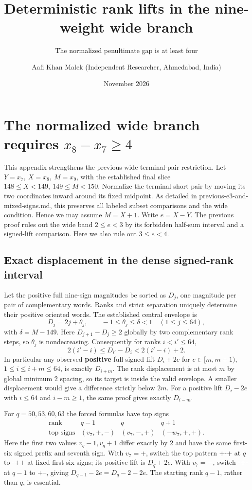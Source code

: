 \documentclass[
  11pt,
]{article}
\title{Deterministic rank lifts in the nine-weight wide branch}
\subtitle{The normalized penultimate gap is at least four}
\author{Aafi Khan Malek (Independent Researcher, Ahmedabad, India)}
\date{November 2026}
\begin{document}
\maketitle

\section{\texorpdfstring{The normalized wide branch requires
\(x_8-x_7\ge4\)}{The normalized wide branch requires x\_8-x\_7\textbackslash ge4}}\label{the-normalized-wide-branch-requires-x_8-x_7ge4}

This appendix strengthens the previous wide terminal-pair restriction.
Let \(Y=x_7,\ X=x_8,\ M=x_9\), with the established final slice
\(148\le X<149,\ 149\le M<150\). Normalize the terminal short pair by
moving its two coordinates inward around its fixed midpoint. As detailed
in previous-e3-and-mixed-signs.md, this preserves all labeled subset
comparisons and the wide condition. Hence we may assume \(M=X+1\). Write
\(e=X-Y\). The previous proof rules out the wide band \(2\le e<3\) by
its forbidden half-sum interval and a signed-lift comparison. Here we
also rule out \(3\le e<4\).

\subsection{Exact displacement in the dense signed-rank
interval}\label{exact-displacement-in-the-dense-signed-rank-interval}

Let the positive full nine-sign magnitudes be sorted as \(D_j\), one
magnitude per pair of complementary words. Ranks and strict separation
uniquely determine their positive oriented words. The established
central envelope is \[
  D_j=2j+\theta_j,\qquad -1\le\theta_j\le\delta<1
  \quad(1\le j\le64),
\] with \(\delta=M-149\). Here \(D_{j+1}-D_j\ge2\) globally by two
complementary rank steps, so \(\theta_j\) is nondecreasing. Consequently
for ranks \(i<i'\le64\), \[
 2(i'-i)\le D_{i'}-D_i<2(i'-i)+2 .
\] In particular any observed \textbf{positive} full signed lift
\(D_i+2e\) for \(e\in[m,m+1)\), \(1\le i\le i+m\le64\), is exactly
\(D_{i+m}\). The rank displacement is at most \(m\) by global minimum 2
spacing, so its target is inside the valid envelope. A smaller
displacement would give a difference strictly below \(2m\). For a
positive lift \(D_i-2e\) with \(i\le64\) and \(i-m\ge1\), the same proof
gives exactly \(D_{i-m}\).

For \(q=50,53,60,63\) the forced formulas have top signs \[
\begin{array}{c|ccc}
\text{rank}&q-1&q&q+1\\
\text{top signs}&(v_7,+,-)&(v_7,-,+)&(-w_7,+,+).
\end{array}
\] Here the first two values \(v_q-1,v_q+1\) differ exactly by 2 and
have the same first-six signed prefix and seventh sign. With \(v_7=+\),
switch the top pattern \(\texttt{+-+}\) at \(q\) to \(\texttt{-++}\) at
fixed first-six signs; its positive lift is \(D_q+2e\). With \(v_7=-\),
switch \(\texttt{-+-}\) at \(q-1\) to \(\texttt{+--}\), giving
\(D_{q-1}-2e=D_q-2-2e\). The starting rank \(q-1\), rather than \(q\),
is essential.
\end{document}
